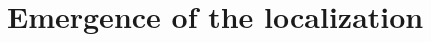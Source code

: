 \documentclass[a4paper,11pt]{article}
\theoremstyle{remark}
\begin{document}
\section{Emergence of the localization}
%
%
%
%
%
\end{document}
